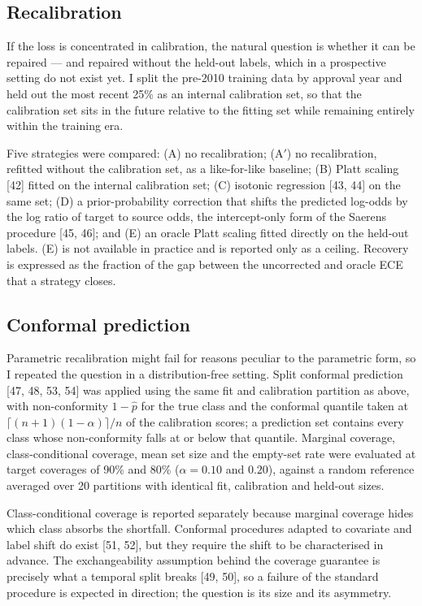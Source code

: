 \subsection{Recalibration}

If the loss is concentrated in calibration, the natural question is whether it can be repaired --- and repaired without the held-out labels, which in a prospective setting do not exist yet. I split the pre-2010 training data by approval year and held out the most recent 25\% as an internal calibration set, so that the calibration set sits in the future relative to the fitting set while remaining entirely within the training era.

Five strategies were compared: (A) no recalibration; (A$'$) no recalibration, refitted without the calibration set, as a like-for-like baseline; (B) Platt scaling [42] fitted on the internal calibration set; (C) isotonic regression [43, 44] on the same set; (D) a prior-probability correction that shifts the predicted log-odds by the log ratio of target to source odds, the intercept-only form of the Saerens procedure [45, 46]; and (E) an oracle Platt scaling fitted directly on the held-out labels. (E) is not available in practice and is reported only as a ceiling. Recovery is expressed as the fraction of the gap between the uncorrected and oracle ECE that a strategy closes.

\subsection{Conformal prediction}

Parametric recalibration might fail for reasons peculiar to the parametric form, so I repeated the question in a distribution-free setting. Split conformal prediction [47, 48, 53, 54] was applied using the same fit and calibration partition as above, with non-conformity $1 - \hat{p}$ for the true class and the conformal quantile taken at $\lceil (n+1)(1-\alpha) \rceil / n$ of the calibration scores; a prediction set contains every class whose non-conformity falls at or below that quantile. Marginal coverage, class-conditional coverage, mean set size and the empty-set rate were evaluated at target coverages of 90\% and 80\% ($\alpha = 0.10$ and $0.20$), against a random reference averaged over 20 partitions with identical fit, calibration and held-out sizes.

Class-conditional coverage is reported separately because marginal coverage hides which class absorbs the shortfall. Conformal procedures adapted to covariate and label shift do exist [51, 52], but they require the shift to be characterised in advance. The exchangeability assumption behind the coverage guarantee is precisely what a temporal split breaks [49, 50], so a failure of the standard procedure is expected in direction; the question is its size and its asymmetry.

